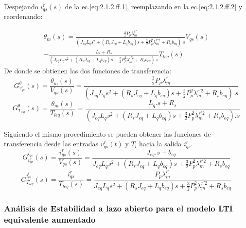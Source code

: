 \documentclass[10pt]{article}
\begin{document}
\begin{enumerate}
Despejando $i^{r}_{qs}(s)$ de la ec.\ref{eq:2.1.2.ff.1}, reemplazando en la ec.\ref{eq:2.1.2.ff.2} y reordenando:

\begin{eqnarray}
	\theta_{m}(s)=\frac{\frac{3}{2}P_{p}\lambda^{r'}_{m}}{(J_{eq}L_{q}s^{2}+(R_{s}J_{eq}+L_{q}b_{eq})s + \frac{3}{2}P_{p}^{2}\lambda ^{r'2}_{m}+R_{s}b_{eq}).s} V_{qs}(s) \nonumber\\
	- \frac{L_{s}+R_{s}}{(J_{eq}L_{q}s^{2}+(R_{s}J_{eq}+L_{q}b_{eq})s + \frac{3}{2}P_{p}^{2}\lambda ^{r'2}_{m}+R_{s}b_{eq}).s} T_{leq}(s)
	\label{eq:2.1.2.ff.3}
	\end{eqnarray}
De donde se obtienen las dos funciones de transferencia:
\begin{equation}
	G^{\theta}_{v^{r}_{qs}}(s)=\frac{\theta_{m}(s)}{V_{qs}(s)}=\frac{\frac{3}{2}P_{p}\lambda^{r'}_{m}}{(J_{eq}L_{q}s^{2}+(R_{s}J_{eq}+L_{q}b_{eq})s + \frac{3}{2}P_{p}^{2}\lambda ^{r'2}_{m}+R_{s}b_{eq}).s}
	\label{eq:2.1.2.ff.4}
	\end{equation}
	\begin{equation}
	G^{\theta}_{T_{leq}}(s)=\frac{\theta_{m}(s)}{T_{leq}(s)}=\frac{L_{q}.s+R_{s}}{(J_{eq}L_{q}s^{2}+(R_{s}J_{eq}+L_{q}b_{eq})s + \frac{3}{2}P_{p}^{2}\lambda ^{r'2}_{m}+R_{s}b_{eq}).s}
	\label{eq:2.1.2.ff.5}
	\end{equation} 


Siguiendo el mismo procedimiento se pueden obtener las funciones de transferencia desde las entradas $v^{r}_{qs}(t)$ y $T_{l}$ hacia la salida $i^{r}_{qs}$.\\
\begin{equation}
	G^{i^{r}_{qs}}_{v^{r}_{qs}}(s)=\frac{i^{r}_{qs}(s)}{V_{qs}(s)}=\frac{J_{eq}.s+b_{eq}}{J_{eq}L_{q}s^{2}+(R_{s}J_{eq}+L_{q}b_{eq})s + \frac{3}{2}P_{p}^{2}\lambda ^{r'2}_{m}+R_{s}b_{eq}}
	\label{eq:2.1.2.ff.6}
	\end{equation}
	\begin{equation}
	G^{i^{r}_{qs}}_{T_{leq}}(s)=\frac{i^{r}_{qs}}{T_{leq}(s)}=\frac{P_{p}\lambda^{r'}_{m}}{J_{eq}L_{q}s^{2}+(R_{s}J_{eq}+L_{q}b_{eq})s + \frac{3}{2}P_{p}^{2}\lambda ^{r'2}_{m}+R_{s}b_{eq}}
	\label{eq:2.1.2.ff.7}
	\end{equation} 
\end{enumerate}

\subsubsection{Análisis de Estabilidad a lazo abierto para el modelo LTI equivalente aumentado}
\end{document}
